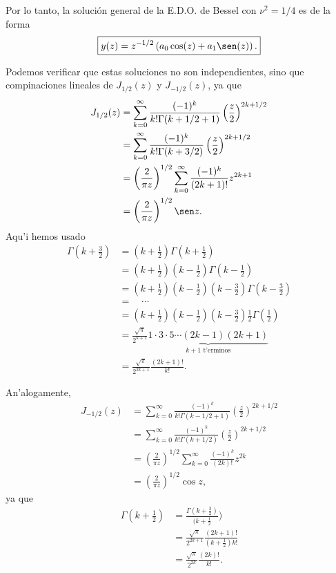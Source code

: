 Por lo tanto, la soluci\'on general de la E.D.O. de Bessel con $\nu^2=1/4$ es de la forma
\begin{equation}
\boxed{y(z)= z^{-1/2}\left(a_0\cos(z)+a_1\sen(z) \right).}
\end{equation}

Podemos verificar que estas soluciones no son independientes, sino que compinaciones lineales de $J_{1/2}(z)$ y $J_{-1/2}(z)$, ya que
\begin{align}
J_{1/2}(z) &= \sum_{k=0}^\infty\frac{(-1)^k}{k!\Gamma(k+1/2+1)}
\left(\frac{z}{2}\right)^{2k+1/2} \\
&= \sum_{k=0}^\infty\frac{(-1)^k}{k!\Gamma(k+3/2)}
\left(\frac{z}{2}\right)^{2k+1/2} \\
&= \left(\frac{2}{\pi z}\right)^{1/2} \sum_{k=0}^\infty \frac{(-1)^k}
{(2k+1)!} z^{2k+1} \\
&= \left(\frac{2}{\pi z}\right)^{1/2} \sen z. \label{J1/2}
\end{align}
Aqu'i hemos usado
\begin{align}
\Gamma(k+\frac{3}{2}) &= (k+\frac{1}{2})\Gamma(k+\frac{1}{2}) \\
&= (k+\frac{1}{2})(k-\frac{1}{2})\Gamma(k-\frac{1}{2}) \\
&=  (k+\frac{1}{2})(k-\frac{1}{2})(k-\frac{3}{2})\Gamma(k-\frac{3}{2}) \\
&= \quad \cdots \\
&=  (k+\frac{1}{2})(k-\frac{1}{2})(k-\frac{3}{2})\frac{1}{2}\Gamma(\frac{1}{2}) \\
&= \frac{\sqrt{\pi}}{2^{k+1}} \underbrace{1\cdot 3\cdot 5\cdots (2k-1)(2k+1)}_{k+1\text{ t'erminos}} \\
&= \frac{\sqrt{\pi}}{2^{2k+1}}\frac{(2k+1)!}{k!}.
\end{align}

An'alogamente,
\begin{align}
J_{-1/2}(z) &= \sum_{k=0}^\infty\frac{(-1)^k}{k!\Gamma(k-1/2+1)}
\left(\frac{z}{2}\right)^{2k+1/2} \\
&= \sum_{k=0}^\infty\frac{(-1)^k}{k!\Gamma(k+1/2)}
\left(\frac{z}{2}\right)^{2k+1/2} \\
&= \left(\frac{2}{\pi z}\right)^{1/2} \sum_{k=0}^\infty \frac{(-1)^k}
{(2k)!} z^{2k} \\
&= \left(\frac{2}{\pi z}\right)^{1/2} \cos z, \label{J-1/2}
\end{align}
ya que
\begin{align}
\Gamma(k+\frac{1}{2}) &= \frac{\Gamma(k+\frac{3}{2})}{(k+\frac{1}{2}}) \\
&= \frac{\sqrt{\pi}}{2^{2k+1}}\frac{(2k+1)!}{(k+\frac{1}{2})k!}\\
&= \frac{\sqrt{\pi}}{2^{2k}}\frac{(2k)!}{k!}.
\end{align}
